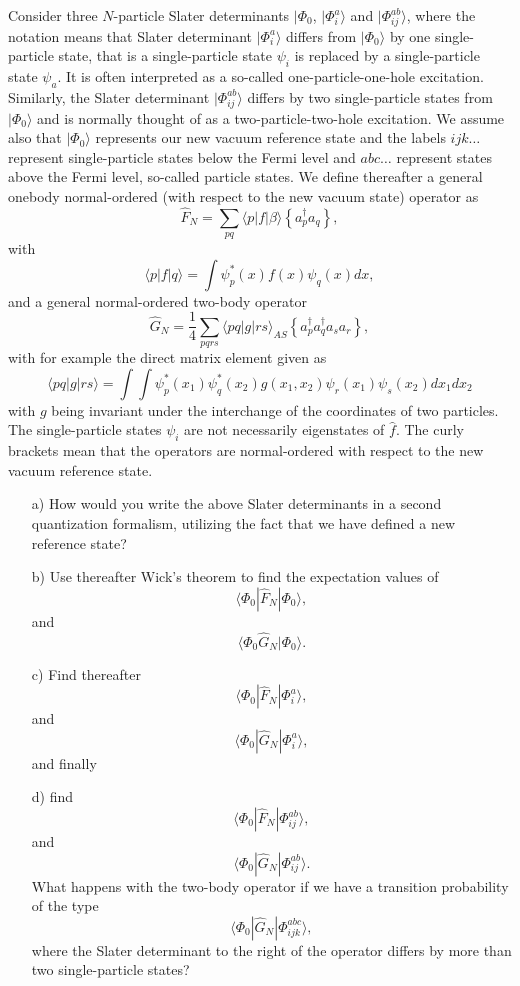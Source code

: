 \documentclass[prc]{revtex4}
\begin{document}
Consider three $N$-particle 
Slater determinants  $|\Phi_0$, $|\Phi_i^a\rangle$ and $|\Phi_{ij}^{ab}\rangle$, where the notation means that 
Slater determinant $|\Phi_i^a\rangle$ differs from $|\Phi_0\rangle$ by one single-particle state, that is a single-particle
state $\psi_i$ is replaced by a single-particle state $\psi_a$. 
It is often interpreted as a so-called one-particle-one-hole excitation.
Similarly, the Slater determinant $|\Phi_{ij}^{ab}\rangle$
differs by two single-particle states from $|\Phi_0\rangle$ and is normally thought of as a two-particle-two-hole excitation.
We assume also that $|\Phi_0\rangle$ represents our new vacuum reference state
and the labels $ijk\dots$ represent single-particle states below the Fermi level and $abc\dots$ represent states above the Fermi level, so-called particle states.
We define thereafter a general onebody normal-ordered (with respect to the new vacuum state) operator 
as
\[
\hat{F}_N=\sum_{pq}\langle p |f |\beta\rangle \left\{a_{p}^{\dagger}a_{q}\right\}  ,
\]
with
\[
\langle p |f| q\rangle=\int \psi_{p}^{*}(x)f(x)\psi_{q}(x)dx ,
\]
and a general normal-ordered two-body operator
\[
\hat{G}_N = \frac{1}{4}\sum_{pqrs}
\langle pq |g| rs\rangle_{AS} \left\{a_{p}^{\dagger}a_{q}^{\dagger}a_{s}a_{r}\right\} ,
\]
with for example the direct matrix element given as
\[
\langle pq |g| rs\rangle=
\int\int \psi_{p}^{*}(x_{1})\psi_{q}^{*}(x_{2})g(x_{1}, x_{2})\psi_{r}(x_{1})\psi_{s}(x_{2})dx_{1}dx_{2}
\]
with $g$ being invariant under the interchange of the coordinates of two particles.
The single-particle states $\psi_i$ are not necessarily eigenstates of $\hat{f}$.  The curly brackets mean that the operators are normal-ordered with respect to the new vacuum reference state. 
\begin{enumerate}
\item[a)]  How would you write the above Slater determinants in a second quantization formalism, utilizing the fact that we have defined a new reference state? 

\item[b)] Use thereafter Wick's theorem to find the expectation values of 
\[
\langle \Phi_0 |\hat{F}_N|\Phi_0\rangle,
\]
and
\[
\langle \Phi_0\hat{G}_N|\Phi_0\rangle.
\]
\item[c)] Find thereafter 
\[
\langle \Phi_0 |\hat{F}_N|\Phi_i^a\rangle,
\]
and
\[
\langle \Phi_0|\hat{G}_N|\Phi_i^a\rangle,
\]
and finally
\item[d)] find 
\[
\langle \Phi_0 |\hat{F}_N|\Phi_{ij}^{ab}\rangle,
\]
and
\[
\langle \Phi_0|\hat{G}_N|\Phi_{ij}^{ab}\rangle.
\]
What happens with the two-body operator if we have a transition probability  of the type
\[
\langle \Phi_0|\hat{G}_N|\Phi_{ijk}^{abc}\rangle,
\]
where the Slater determinant to the right of the operator differs by more than two single-particle states?
\end{enumerate}
\end{document}
